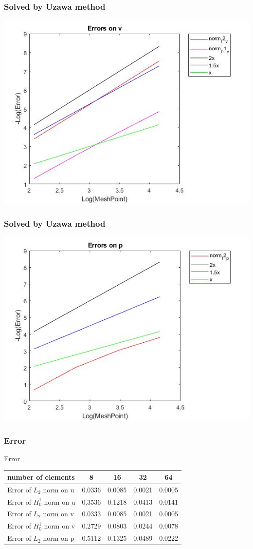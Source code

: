 \documentclass[11pt]{beamer}
\numberwithin{equation}{section}
\theoremstyle{plain}
\theoremstyle{definition}
\theoremstyle{remark}
\begin{document}
\begin{frame}\frametitle{Solved by Uzawa method}
\includegraphics[scale=0.5]{12}
\end{frame}
\begin{frame}\frametitle{Solved by Uzawa method}
\includegraphics[scale=0.5]{13}
\end{frame}
\begin{frame}\frametitle{Error}
\begin{block}{Error}
\begin{tabular}{|l||c||c||c||c|}
\hline 
number of elements  & 8 & 16 & 32 & 64  \\ 
\hline 
Error of $L_2$ norm on u  & 0.0336  &0.0085 & 0.0021 & 0.0005  \\
\hline
Error of $H_0^1$ norm on u  & 0.3536 & 0.1218 & 0.0413 & 0.0141 \\
\hline
Error of $L_2$ norm on v  & 0.0333  &0.0085 & 0.0021 & 0.0005  \\
\hline
Error of $H_0^1$ norm on v  & 0.2729 & 0.0803 & 0.0244 & 0.0078  \\
\hline
Error of $L_2$ norm on p  & 0.5112  &0.1325 & 0.0489 & 0.0222  \\
\hline
\end{tabular}
\end{block}
\end{frame}
\end{document}
